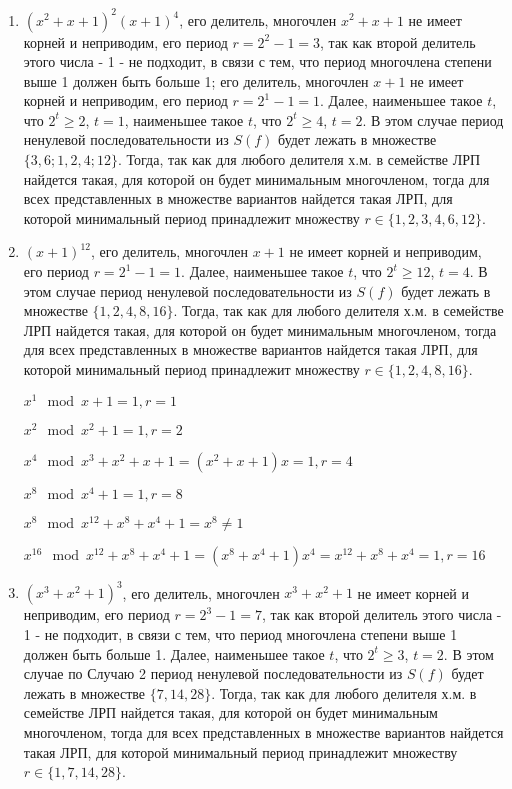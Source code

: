 \documentclass[utf8x, 14pt]{G7-32} %
\begin{document}
\begin{enumerate}
    \item $(x^2+x+1)^2(x+1)^4$, его делитель, многочлен $x^2+x+1$ не имеет корней и неприводим, его период $r = 2^2 -1 = 3$, так как второй делитель этого числа - 1 - не подходит, в связи с тем, что период многочлена степени выше 1 должен быть больше 1; его делитель, многочлен $x+1$ не имеет корней и неприводим, его период $r = 2^1 -1 = 1$. Далее, наименьшее такое $t$, что $2^t \geq 2$, $t=1$, наименьшее такое $t$, что $2^t \geq 4$, $t=2$. В этом случае период ненулевой последовательности из $S(f)$ будет лежать в множестве $\{3, 6; 1, 2, 4; 12\}$. Тогда, так как для любого делителя х.м. в семействе ЛРП найдется такая, для которой он будет минимальным многочленом, тогда для всех представленных в множестве вариантов найдется такая ЛРП, для которой минимальный период принадлежит множеству $r \in \{1,2,3,4,6,12 \}$.
    \item $(x+1)^{12}$, его делитель, многочлен $x+1$ не имеет корней и неприводим, его период $r = 2^1 -1 = 1$. Далее, наименьшее такое $t$, что $2^t \geq 12$, $t=4$. В этом случае период ненулевой последовательности из $S(f)$ будет лежать в множестве $\{1, 2, 4, 8, 16\}$. Тогда, так как для любого делителя х.м. в семействе ЛРП найдется такая, для которой он будет минимальным многочленом, тогда для всех представленных в множестве вариантов найдется такая ЛРП, для которой минимальный период принадлежит множеству $r \in \{1, 2, 4, 8, 16\}$.
    
    $x^1 \mod x+1 = 1, r = 1$
    
    $x^2 \mod x^2+1 = 1, r = 2$
    
    $x^4 \mod x^3 + x^2 + x +1 = (x^2 + x + 1) x = 1, r = 4$
    
    $x^8 \mod x^4+1 = 1, r = 8$
    
    $x^8 \mod x^12 +x^8 + x^4 + 1 = x^8 \neq 1$
    
    $x^{16} \mod x^{12} +x^8 + x^4 + 1 = (x^8 + x^4 + 1) x^4 = x^{12} + x^8 + x^4 = 1, r = 16 $
    
    \item $(x^3+x^2+1)^3$, его делитель, многочлен $x^3+x^2+1$ не имеет корней и неприводим, его период $r = 2^3 -1 = 7$, так как второй делитель этого числа - 1 - не подходит, в связи с тем, что период многочлена степени выше 1 должен быть больше 1. Далее, наименьшее такое $t$, что $2^t \geq 3$, $t=2$. В этом случае по Случаю 2 период ненулевой последовательности из $S(f)$ будет лежать в множестве $\{7, 14, 28\}$. Тогда, так как для любого делителя х.м. в семействе ЛРП найдется такая, для которой он будет минимальным многочленом, тогда для всех представленных в множестве вариантов найдется такая ЛРП, для которой минимальный период принадлежит множеству $r \in \{1, 7, 14, 28\}$. 
    

\end{enumerate}
\end{document}
